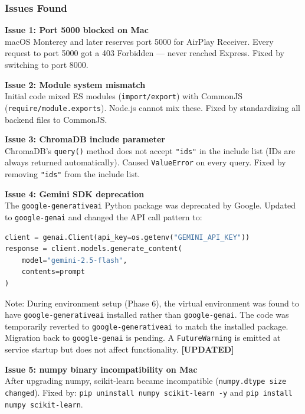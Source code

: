 \documentclass[a4paper,11pt]{article}
\begin{document}
\subsubsection{Issues Found}

\textbf{Issue 1: Port 5000 blocked on Mac}\\
macOS Monterey and later reserves port 5000 for AirPlay Receiver. Every request to port 5000 got a 403 Forbidden --- never reached Express. Fixed by switching to port 8000.

\vspace{4pt}
\textbf{Issue 2: Module system mismatch}\\
Initial code mixed ES modules (\texttt{import/export}) with CommonJS (\texttt{require/module.exports}). Node.js cannot mix these. Fixed by standardizing all backend files to CommonJS.

\vspace{4pt}
\textbf{Issue 3: ChromaDB include parameter}\\
ChromaDB's \texttt{query()} method does not accept \texttt{"ids"} in the include list (IDs are always returned automatically). Caused \texttt{ValueError} on every query. Fixed by removing \texttt{"ids"} from the include list.

\vspace{4pt}
\textbf{Issue 4: Gemini SDK deprecation}\\
The \texttt{google-generativeai} Python package was deprecated by Google. Updated to \texttt{google-genai} and changed the API call pattern to:
\begin{lstlisting}[language=Python]
client = genai.Client(api_key=os.getenv("GEMINI_API_KEY"))
response = client.models.generate_content(
    model="gemini-2.5-flash",
    contents=prompt
)
\end{lstlisting}
Note: During environment setup (Phase 6), the virtual environment was found to have \texttt{google-generativeai} installed rather than \texttt{google-genai}. The code was temporarily reverted to \texttt{google-generativeai} to match the installed package. Migration back to \texttt{google-genai} is pending. A \texttt{FutureWarning} is emitted at service startup but does not affect functionality. \textbf{[UPDATED]}

\vspace{4pt}
\textbf{Issue 5: numpy binary incompatibility on Mac}\\
After upgrading numpy, scikit-learn became incompatible (\texttt{numpy.dtype size changed}). Fixed by: \texttt{pip uninstall numpy scikit-learn -y} and \texttt{pip install numpy scikit-learn}.
\end{document}
